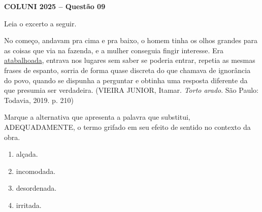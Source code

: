 \textbf{COLUNI 2025 -- Questão 09}\par\medskip Leia o excerto a seguir.

\par

No começo, andavam pra cima e pra baixo, o homem tinha os olhos grandes para as coisas que via na fazenda, e a mulher conseguia fingir interesse. Era \underline{atabalhoada}, entrava nos lugares sem saber se poderia entrar, repetia as mesmas frases de espanto, sorria de forma quase discreta do que chamava de ignorância do povo, quando se dispunha a perguntar e obtinha uma resposta diferente da que presumia ser verdadeira. (VIEIRA JUNIOR, Itamar. \textit{Torto arado}. São Paulo: Todavia, 2019. p. 210)

\par

Marque a alternativa que apresenta a palavra que substitui, ADEQUADAMENTE, o termo grifado em seu efeito de sentido no contexto da obra.

\par

\begin{enumerate}
\item alçada.
\item incomodada.
\item desordenada.
\item irritada.
\end{enumerate}
